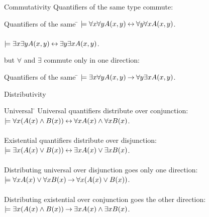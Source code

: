 \documentclass[style=sailor,size=12pt]{powerdot}
\begin{document}
\begin{wideslide}[bm=,toc=]{Commutativity}
Quantifiers of the same type commute:
\pause
\begin{tabbing}
Quantifiers of the same \= \kill
\> $\models \forall x \forall y A(x,y) \mathbin{\leftrightarrow} \forall y \forall x A(x,y)$.\\
\pause
\> ~\\ 
\> $\models \exists x \exists y A(x,y) \mathbin{\leftrightarrow} \exists y \exists x A(x,y)$.\\
\end{tabbing}

\pause
but $\forall$ and $\exists$ commute only in one direction:
\pause
\begin{tabbing}
Quantifiers of the same \= \kill
\> $\models \exists x \forall y A(x,y) \mathbin{\rightarrow} \forall y \exists x A(x,y)$.\\
\end{tabbing}

\end{wideslide}

\begin{wideslide}[bm=,toc=]{Distributivity}
\begin{tabbing}
Universal \= \kill
Universal quantifiers distribute over conjunction:  \> \\[2mm]
\pause
\>$\models \forall x(A(x) \land B(x)) \mathbin{\leftrightarrow} \forall x A(x) \land \forall x B(x)$.\\
~\\
\pause
Existential quantifiers distribute over disjunction:\\[2mm]
\pause
\>$\models \exists x(A(x) \lor B(x)) \mathbin{\leftrightarrow} \exists x A(x) \lor \exists x B(x)$.\\
~\\
\pause
Distributing universal over disjunction goes only one direction:\\[2mm]
\pause
\>$\models \forall x A(x) \lor \forall x B(x) \mathbin{\rightarrow} \forall x(A(x) \lor B(x))$.\\
~\\
\pause
Distributing existential over conjunction goes the other direction:\\[2mm]
\pause
\>$\models \exists x(A(x) \land B(x)) \mathbin{\rightarrow} \exists x A(x) \land \exists x B(x)$.\\
\end{tabbing}

\end{wideslide}
\end{document}

